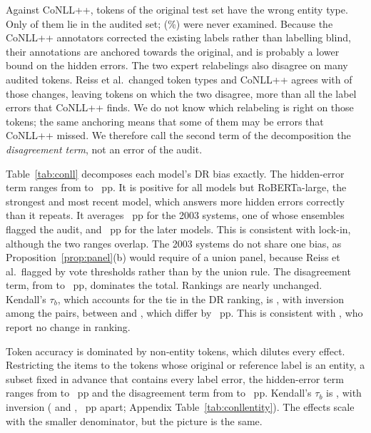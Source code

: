 Against CoNLL++, \cnRefErr{} tokens of the original test set have the wrong entity type. Only \cnRefErrIn{} of them lie in the audited set; \cnHidden{} (\cnHiddenPct\%) were never examined. Because the CoNLL++ annotators corrected the existing labels rather than labelling blind, their annotations are anchored towards the original, and \cnHidden{} is probably a lower bound on the hidden errors. The two expert relabelings also disagree on many audited tokens. Reiss et al.\ changed \cnReissChanges{} token types and CoNLL++ agrees with \cnAgreeChanges{} of those changes, leaving \cnDisagreeChanges{} tokens on which the two disagree, more than all the label errors that CoNLL++ finds. We do not know which relabeling is right on those tokens; the same anchoring means that some of them may be errors that CoNLL++ missed. We therefore call the second term of the decomposition the \emph{disagreement term}, not an error of the audit.

Table~\ref{tab:conll} decomposes each model's DR bias exactly. The hidden-error term ranges from \cnHiddenMin{} to \cnHiddenMax~pp. It is positive for all models but RoBERTa-large, the strongest and most recent model, which answers more hidden errors correctly than it repeats. It averages \cnHiddenEntrantMean~pp for the 2003 systems, one of whose ensembles flagged the audit, and \cnHiddenHfMean~pp for the later models. This is consistent with lock-in, although the two ranges overlap. The 2003 systems do not share one bias, as Proposition~\ref{prop:panel}(b) would require of a union panel, because Reiss et al.\ flagged by vote thresholds rather than by the union rule. The disagreement term, from \cnAdjMin{} to \cnAdjMax~pp, dominates the total. Rankings are nearly unchanged. Kendall's $\tau_b$, which accounts for the \cnTies{} tie in the DR ranking, is \cnTau, with \cnNinv{} inversion among the \cnPairs{} pairs, between \cnInvA{} and \cnInvB, which differ by \cnInvGap~pp. This is consistent with \citet{reiss2020identifying}, who report no change in ranking.

Token accuracy is dominated by non-entity tokens, which dilutes every effect. Restricting the items to the \cnEnt{} tokens whose original or reference label is an entity, a subset fixed in advance that contains every label error, the hidden-error term ranges from \cnEntHiddenMin{} to \cnEntHiddenMax~pp and the disagreement term from \cnEntAdjMin{} to \cnEntAdjMax~pp. Kendall's $\tau_b$ is \cnEntTau, with \cnEntNinv{} inversion (\cnEntInvA{} and \cnEntInvB, \cnEntInvGap~pp apart; Appendix Table~\ref{tab:conllentity}). The effects scale with the smaller denominator, but the picture is the same.

